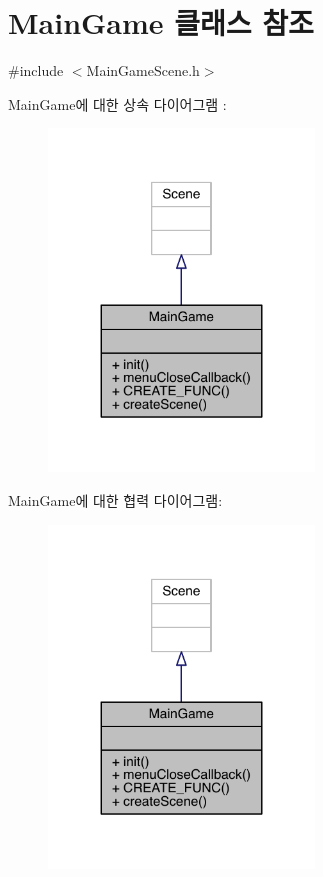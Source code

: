 \hypertarget{class_main_game}{}\section{Main\+Game 클래스 참조}
\label{class_main_game}


{\ttfamily \#include $<$Main\+Game\+Scene.\+h$>$}



Main\+Game에 대한 상속 다이어그램 \+: 
\nopagebreak
\begin{figure}[H]
\begin{center}
\leavevmode
\includegraphics[width=200pt]{class_main_game__inherit__graph}
\end{center}
\end{figure}


Main\+Game에 대한 협력 다이어그램\+:
\nopagebreak
\begin{figure}[H]
\begin{center}
\leavevmode
\includegraphics[width=200pt]{class_main_game__coll__graph}
\end{center}
\end{figure}
